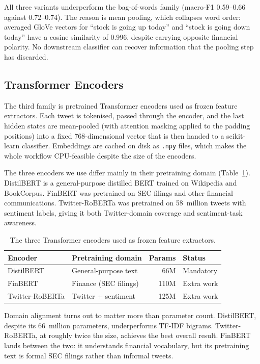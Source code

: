 \documentclass[12pt,a4paper]{article}
\begin{document}
All three variants underperform the bag-of-words family (macro-F1 0.59--0.66 against 0.72--0.74). The reason is mean pooling, which collapses word order: averaged GloVe vectors for ``stock is going up today'' and ``stock is going down today'' have a cosine similarity of 0.996, despite carrying opposite financial polarity. No downstream classifier can recover information that the pooling step has discarded.

\subsection{Transformer Encoders}

The third family is pretrained Transformer encoders used as frozen feature extractors. Each tweet is tokenised, passed through the encoder, and the last hidden states are mean-pooled (with attention masking applied to the padding positions) into a fixed 768-dimensional vector that is then handed to a scikit-learn classifier. Embeddings are cached on disk as \texttt{.npy} files, which makes the whole workflow CPU-feasible despite the size of the encoders.

The three encoders we use differ mainly in their pretraining domain (Table~\ref{tab:transformers}). DistilBERT is a general-purpose distilled BERT trained on Wikipedia and BookCorpus. FinBERT was pretrained on SEC filings and other financial communications. Twitter-RoBERTa was pretrained on 58~million tweets with sentiment labels, giving it both Twitter-domain coverage and sentiment-task awareness.

\begin{table}[!htbp]
\centering
\begin{tabular}{llrl}
\toprule
\textbf{Encoder} & \textbf{Pretraining domain} & \textbf{Params} & \textbf{Status} \\
\midrule
DistilBERT       & General-purpose text    & 66M  & Mandatory \\
FinBERT          & Finance (SEC filings)   & 110M & Extra work \\
Twitter-RoBERTa  & Twitter + sentiment     & 125M & Extra work \\
\bottomrule
\end{tabular}
\caption{The three Transformer encoders used as frozen feature extractors.}
\label{tab:transformers}
\end{table}

Domain alignment turns out to matter more than parameter count. DistilBERT, despite its 66~million parameters, underperforms TF-IDF bigrams. Twitter-RoBERTa, at roughly twice the size, achieves the best overall result. FinBERT lands between the two: it understands financial vocabulary, but its pretraining text is formal SEC filings rather than informal tweets.
\end{document}
